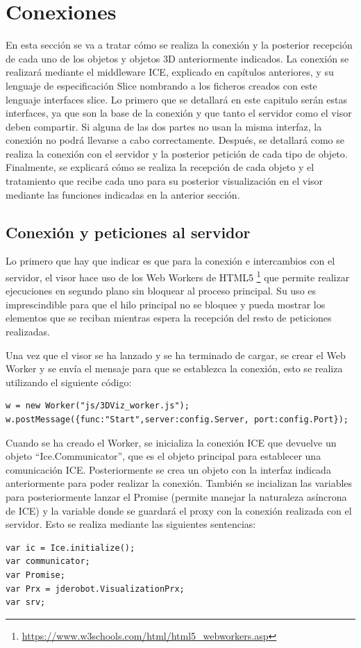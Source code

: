 \section{Conexiones}
En esta sección se va a tratar cómo se realiza la conexión y la posterior recepción de cada uno de los objetos y objetos 3D anteriormente indicados. La conexión se realizará mediante el middleware ICE, explicado en capítulos anteriores, y su lenguaje de especificación Slice nombrando a los ficheros creados con este lenguaje interfaces slice. Lo primero que se detallará en este capitulo serán estas interfaces, ya que son la base de la conexión y que tanto el servidor como el visor deben compartir. Si alguna de las dos partes no usan la misma interfaz, la conexión no podrá llevarse a cabo correctamente. Después, se detallará como se realiza la conexión con el servidor y la posterior petición de cada tipo de objeto. Finalmente, se explicará cómo se realiza la recepción de cada objeto y el tratamiento que recibe cada uno para su posterior visualización en el visor mediante las funciones indicadas en la anterior sección.

\subsection{Conexión y peticiones al servidor}
Lo primero que hay que indicar es que para la conexión e intercambios con el servidor, el visor hace uso de los Web Workers de HTML5 \footnote{\url{https://www.w3schools.com/html/html5_webworkers.asp}} que permite realizar ejecuciones en segundo plano sin bloquear al proceso principal. Su uso es imprescindible para que el hilo principal no se bloquee y pueda mostrar los elementos que se reciban mientras espera la recepción del resto de peticiones realizadas.

Una vez que el visor se ha lanzado y se ha terminado de cargar, se crear el Web Worker y se envía el mensaje para que se establezca la conexión, esto se realiza utilizando el siguiente código:
\begin{lstlisting}[frame=single]
w = new Worker("js/3DViz_worker.js");
w.postMessage({func:"Start",server:config.Server, port:config.Port});
\end{lstlisting}

Cuando se ha creado el Worker, se inicializa la conexión ICE que devuelve un objeto ``Ice.Communicator'', que es el objeto principal para establecer una comunicación ICE. Posteriormente se crea un objeto con la interfaz indicada anteriormente para poder realizar la conexión. También se incializan las variables para posteriormente lanzar el Promise (permite manejar la naturaleza asíncrona de ICE) y la variable donde se guardará el proxy con la conexión realizada con el servidor. Esto se realiza mediante las siguientes sentencias:
\begin{lstlisting}[frame=single]
var ic = Ice.initialize();
var communicator;
var Promise;
var Prx = jderobot.VisualizationPrx;
var srv;
\end{lstlisting}


